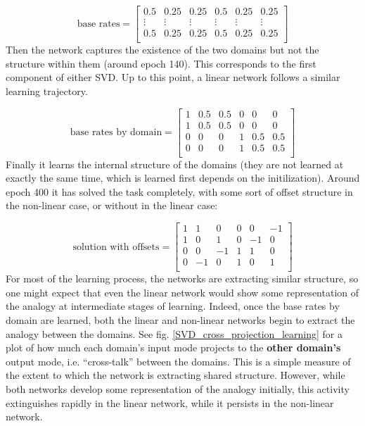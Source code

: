 \documentclass[10pt,letterpaper]{article}
\begin{document}
{ 
\[ 
\text{base rates} = \left[ \begin{matrix} 
0.5 & 0.25 & 0.25 & 0.5 & 0.25 & 0.25 \\
\vdots & \vdots &\vdots &\vdots &\vdots &\vdots \\
 0.5 & 0.25 & 0.25 & 0.5 & 0.25 & 0.25\\
\end{matrix}  \right] 
\] 
}
Then the network captures the existence of the two domains but not the structure within them (around epoch 140). This corresponds to the first component of either SVD. Up to this point, a linear network follows a similar learning trajectory. \par
\vspace{-1em}
{ 
\[
\text{base rates by domain} = \left[ \begin{matrix} 
1 & 0.5 & 0.5 & 0 & 0 & 0 \\
1 & 0.5 & 0.5 & 0 & 0 & 0 \\
0 & 0 & 0 & 1 & 0.5 & 0.5  \\
0 & 0 & 0 & 1 & 0.5 & 0.5  \\
\end{matrix}  \right] 
\] 
}
Finally it learns the internal structure of the domains (they are not learned at exactly the same time, which is learned first depends on the initilization). Around epoch 400 it has solved the task completely, with some sort of offset structure in the non-linear case, or without in the linear case:\par
\vspace{-0.5em}
{ 
\[
\text{solution with offsets} = \left[ \begin{matrix} 
1 & 1 & 0 & 0 & 0 & -1 \\
1 & 0 & 1 & 0 & -1 & 0 \\
 0 & 0 & -1 & 1 & 1 & 0\\
 0 & -1 & 0 & 1 & 0 & 1\\
\end{matrix}  \right] 
\]
}
For most of the learning process, the networks are extracting similar structure, so one might expect that even the linear network would show some representation of the analogy at intermediate stages of learning. Indeed, once the base rates by domain are learned, both the linear and non-linear networks begin to extract the analogy between the domains. See fig. \ref{SVD_cross_projection_learning} for a plot of how much each domain's input mode projects to the \textbf{other domain's} output mode, i.e. ``cross-talk'' between the domains. This is a simple measure of the extent to which the network is extracting shared structure. However, while both networks develop some representation of the analogy initially, this activity extinguishes rapidly in the linear network, while it persists in the non-linear network. \par
\end{document}
